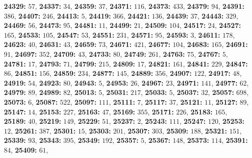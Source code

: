 \textsf{\bfseries 24329:} $57$, \textsf{\bfseries 24337:} $34$, \textsf{\bfseries 24359:} $37$, \textsf{\bfseries 24371:} $116$, \textsf{\bfseries 24373:} $433$, \textsf{\bfseries 24379:} $94$, \textsf{\bfseries 24391:} $386$, \textsf{\bfseries 24407:} $246$, \textsf{\bfseries 24413:} $5$, \textsf{\bfseries 24419:} $366$, \textsf{\bfseries 24421:} $136$, \textsf{\bfseries 24439:} $37$, \textsf{\bfseries 24443:} $329$, \textsf{\bfseries 24469:} $56$, \textsf{\bfseries 24473:} $95$, \textsf{\bfseries 24481:} $11$, \textsf{\bfseries 24499:} $21$, \textsf{\bfseries 24509:} $104$, \textsf{\bfseries 24517:} $24$, \textsf{\bfseries 24527:} $165$, \textsf{\bfseries 24533:} $105$, \textsf{\bfseries 24547:} $53$, \textsf{\bfseries 24551:} $231$, \textsf{\bfseries 24571:} $95$, \textsf{\bfseries 24593:} $3$, \textsf{\bfseries 24611:} $178$, \textsf{\bfseries 24623:} $40$, \textsf{\bfseries 24631:} $43$, \textsf{\bfseries 24659:} $73$, \textsf{\bfseries 24671:} $421$, \textsf{\bfseries 24677:} $104$, \textsf{\bfseries 24683:} $165$, \textsf{\bfseries 24691:} $91$, \textsf{\bfseries 24697:} $352$, \textsf{\bfseries 24709:} $43$, \textsf{\bfseries 24733:} $80$, \textsf{\bfseries 24749:} $261$, \textsf{\bfseries 24763:} $75$, \textsf{\bfseries 24767:} $5$, \textsf{\bfseries 24781:} $17$, \textsf{\bfseries 24793:} $71$, \textsf{\bfseries 24799:} $215$, \textsf{\bfseries 24809:} $17$, \textsf{\bfseries 24821:} $161$, \textsf{\bfseries 24841:} $229$, \textsf{\bfseries 24847:} $86$, \textsf{\bfseries 24851:} $156$, \textsf{\bfseries 24859:} $234$, \textsf{\bfseries 24877:} $145$, \textsf{\bfseries 24889:} $356$, \textsf{\bfseries 24907:} $122$, \textsf{\bfseries 24917:} $48$, \textsf{\bfseries 24919:} $54$, \textsf{\bfseries 24923:} $80$, \textsf{\bfseries 24943:} $5$, \textsf{\bfseries 24953:} $26$, \textsf{\bfseries 24967:} $23$, \textsf{\bfseries 24971:} $141$, \textsf{\bfseries 24977:} $62$, \textsf{\bfseries 24979:} $89$, \textsf{\bfseries 24989:} $82$, \textsf{\bfseries 25013:} $5$, \textsf{\bfseries 25031:} $217$, \textsf{\bfseries 25033:} $5$, \textsf{\bfseries 25037:} $32$, \textsf{\bfseries 25057:} $698$, \textsf{\bfseries 25073:} $6$, \textsf{\bfseries 25087:} $522$, \textsf{\bfseries 25097:} $111$, \textsf{\bfseries 25111:} $7$, \textsf{\bfseries 25117:} $37$, \textsf{\bfseries 25121:} $11$, \textsf{\bfseries 25127:} $89$, \textsf{\bfseries 25147:} $14$, \textsf{\bfseries 25153:} $227$, \textsf{\bfseries 25163:} $47$, \textsf{\bfseries 25169:} $355$, \textsf{\bfseries 25171:} $226$, \textsf{\bfseries 25183:} $165$, \textsf{\bfseries 25189:} $40$, \textsf{\bfseries 25219:} $149$, \textsf{\bfseries 25229:} $51$, \textsf{\bfseries 25237:} $2$, \textsf{\bfseries 25243:} $111$, \textsf{\bfseries 25247:} $120$, \textsf{\bfseries 25253:} $12$, \textsf{\bfseries 25261:} $387$, \textsf{\bfseries 25301:} $15$, \textsf{\bfseries 25303:} $201$, \textsf{\bfseries 25307:} $303$, \textsf{\bfseries 25309:} $188$, \textsf{\bfseries 25321:} $151$, \textsf{\bfseries 25339:} $93$, \textsf{\bfseries 25343:} $395$, \textsf{\bfseries 25349:} $192$, \textsf{\bfseries 25357:} $5$, \textsf{\bfseries 25367:} $148$, \textsf{\bfseries 25373:} $114$, \textsf{\bfseries 25391:} $84$, \textsf{\bfseries 25409:} $61$, 
